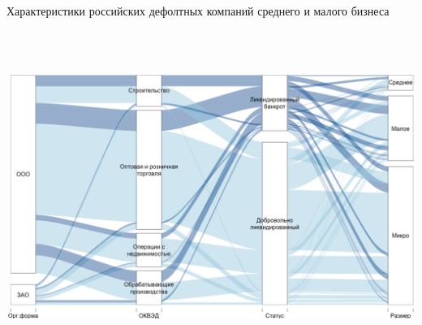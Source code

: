 \documentclass[pdftex,12pt]{article}\usepackage[]{graphicx}\usepackage[]{color}
\begin{document}
\newpage
\begin{center}
Характеристики российских дефолтных компаний среднего и малого бизнеса
\vspace{0.3cm}
\includegraphics[width=17cm,height=11.5cm]{plot1a.jpeg}

\end{center}
\end{document}
